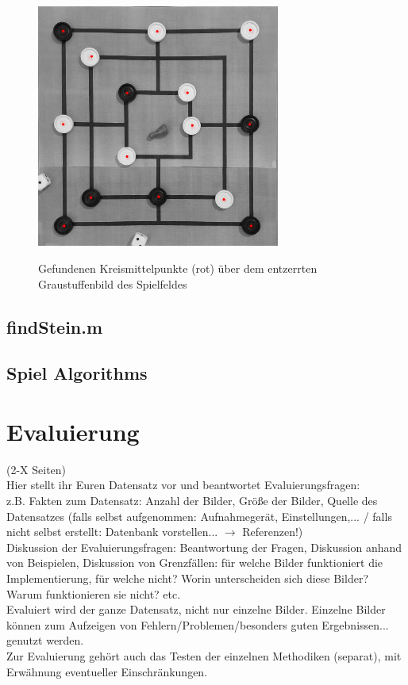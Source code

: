 \documentclass[paper=A4, deutsch]{scrartcl}
\begin{document}
\begin{figure}[ht]
	\centering
		\includegraphics[width=8cm]{hough_performance.jpg}\\
	\caption[Gefundenen Kreismittelpunkte (rot) über dem entzerrten Graustuffenbild des Spielfeldes]{Gefundenen Kreismittelpunkte (rot) über dem entzerrten Graustuffenbild des Spielfeldes}
	\label{fig:hougresult}
\end{figure}


\subsection{findStein.m}

\subsection{Spiel Algorithms}



\section{Evaluierung}
(2-X Seiten)\\
Hier stellt ihr Euren Datensatz vor und beantwortet Evaluierungsfragen:\\
z.B. Fakten zum Datensatz: Anzahl der Bilder, Größe der Bilder, Quelle des Datensatzes (falls selbst aufgenommen: Aufnahmegerät, Einstellungen,... / falls nicht selbst erstellt: Datenbank vorstellen... $\to$ Referenzen!)\\
Diskussion der Evaluierungsfragen: Beantwortung der Fragen, Diskussion anhand von Beispielen, Diskussion von Grenzfällen: für welche Bilder funktioniert die Implementierung, für welche nicht? Worin unterscheiden sich diese Bilder? Warum funktionieren sie nicht? etc.\\
Evaluiert wird der ganze Datensatz, nicht nur einzelne Bilder. Einzelne Bilder können zum Aufzeigen von Fehlern/Problemen/besonders guten Ergebnissen... genutzt werden.\\
Zur Evaluierung gehört auch das Testen der einzelnen Methodiken (separat), mit Erwähnung eventueller Einschränkungen.
\end{document}
